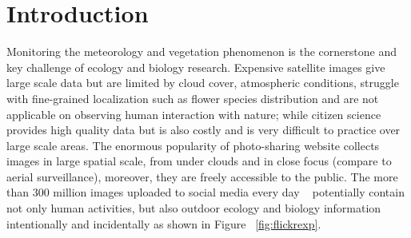 \section{Introduction}

Monitoring the meteorology and vegetation phenomenon is the cornerstone and key challenge of ecology and biology research. Expensive satellite images give large scale data but are limited by cloud cover, 
atmospheric conditions, struggle with fine-grained localization such as flower species distribution and are not applicable on observing human interaction with nature; 
while citizen science provides high quality data but is also costly and is very difficult to practice over large scale areas.
The enormous popularity of photo-sharing website collects images in large spatial scale, from under clouds and in close focus (compare to aerial surveillance), 
moreover, they are freely accessible to the public.
The more than 300 million images uploaded to social media every day ~\cite{facebookstatistics}
 potentially contain not only human activities, but also outdoor ecology and biology 
information intentionally and incidentally as shown in Figure ~\ref{fig:flickrexp}.


